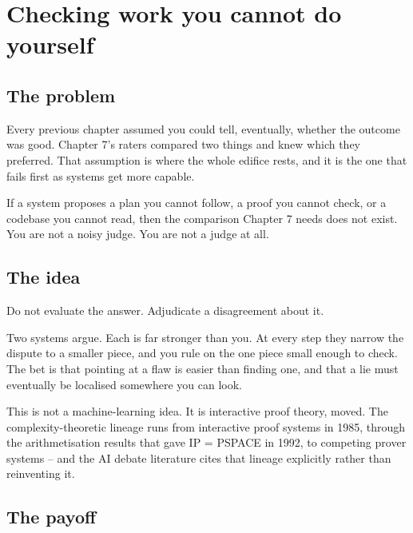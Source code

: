 \chapter{Checking work you cannot do yourself}

\section*{The problem}

Every previous chapter assumed you could tell, eventually, whether the outcome was good. Chapter 7's raters compared two things and knew which they preferred. That assumption is where the whole edifice rests, and it is the one that fails first as systems get more capable.

If a system proposes a plan you cannot follow, a proof you cannot check, or a codebase you cannot read, then the comparison Chapter 7 needs does not exist. You are not a noisy judge. You are not a judge at all.

\section*{The idea}

Do not evaluate the answer. Adjudicate a disagreement about it.

Two systems argue. Each is far stronger than you. At every step they narrow the dispute to a smaller piece, and you rule on the one piece small enough to check. The bet is that pointing at a flaw is easier than finding one, and that a lie must eventually be localised somewhere you can look.

This is not a machine-learning idea. It is interactive proof theory, moved. The complexity-theoretic lineage runs from interactive proof systems in 1985, through the arithmetisation results that gave IP = PSPACE in 1992, to competing prover systems -- and the AI debate literature cites that lineage explicitly rather than reinventing it.

\section*{The payoff}


